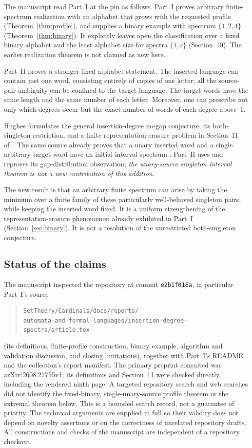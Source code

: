\documentclass[11pt,letterpaper]{article}
\theoremstyle{definition}\newtheorem{definition}[theorem]{Definition}
\theoremstyle{remark}\newtheorem{remark}[theorem]{Remark}
\theoremstyle{definition}\newtheorem{question}[theorem]{Question}
\begin{document}
The manuscript read Part~I at the pin as follows. Part~I proves arbitrary
finite-spectrum realization with an alphabet that grows with the requested
profile (Theorem~\ref{thm:profile}), and supplies a binary example with
spectrum $\{1,2,4\}$ (Theorem~\ref{thm:binary}). It explicitly leaves open the
classification over a fixed binary alphabet and the least alphabet size for
spectra $\{1,r\}$ (Section~10). The earlier realization theorem is not claimed
as new here.

Part~II proves a stronger fixed-alphabet statement. The inserted language can
contain just one word, consisting entirely of copies of one letter; all the
source-pair ambiguity can be confined to the target language. The target
words have the same length and the same number of each letter. Moreover, one
can prescribe not only which degrees occur but the exact number of words of
each degree above~$1$.

Hughes formulates the general insertion-degree no-gap conjecture, its
both-singleton restriction, and a finite representation-erasure problem in
Section~11 of~\cite{Hughes2026}. The same source already proves that a unary
inserted word and a single arbitrary target word have an initial-interval
spectrum \cite[Theorem~9, page~9]{Hughes2026}. Part~II uses and reproves its
gap-distribution observation; \emph{the unary-source singleton interval
theorem is not a new contribution of this addition}.

The new result is that an arbitrary finite spectrum can arise by taking the
minimum over a finite family of these particularly well-behaved singleton
pairs, while keeping the inserted word fixed. It is a uniform strengthening
of the representation-erasure phenomenon already exhibited in Part~I
(Section~\ref{sec:binary}). It is not a resolution of the unrestricted
both-singleton conjecture.

\subsection{Status of the claims}\label{ids:bp:sec:status}

The manuscript inspected the repository at commit \texttt{e2b1f016a}, in
particular Part~I's source
\begin{quote}\small\nolinkurl{SetTheory/Cardinals/docs/reports/}\\
\nolinkurl{automata-and-formal-languages/insertion-degree-spectra/article.tex}\end{quote}
(its definitions, finite-profile construction, binary example,
algorithm and validation discussion, and closing limitations), together with
Part~I's README and the collection's report manifest. The primary preprint
consulted was arXiv:2608.27755v1; its definitions and Section~11 were checked
directly, including the rendered ninth page. A targeted repository search and
web searches did not identify the fixed-binary, single-unary-source profile
theorem or the extremal theorem below. This is a bounded search record, not a
guarantee of priority. The technical arguments are supplied in full so their
validity does not depend on novelty assertions or on the correctness of
unrelated repository drafts. All constructions and checks of the manuscript
are independent of a repository checkout.
\end{document}
